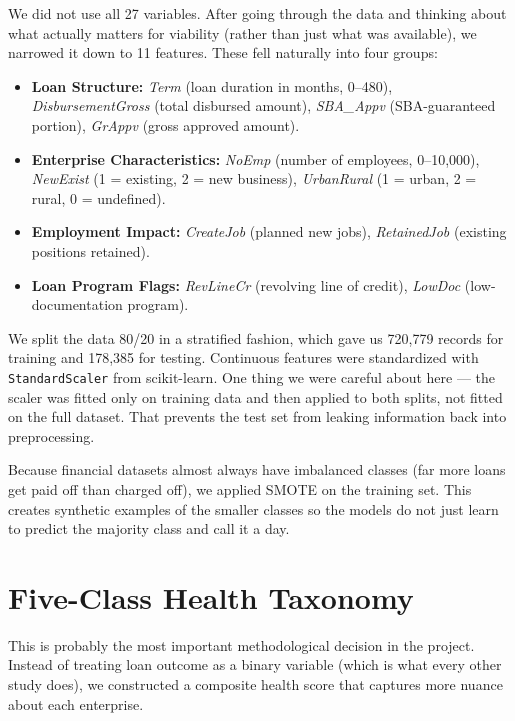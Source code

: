 \documentclass[12pt,a4paper]{report}
\begin{document}
We did not use all 27 variables. After going through the data and thinking about what actually matters for viability (rather than just what was available), we narrowed it down to 11 features. These fell naturally into four groups:

\begin{itemize}
    \item \textbf{Loan Structure:} \textit{Term} (loan duration in months, 0--480), \textit{DisbursementGross} (total disbursed amount), \textit{SBA\_Appv} (SBA-guaranteed portion), \textit{GrAppv} (gross approved amount).
    \item \textbf{Enterprise Characteristics:} \textit{NoEmp} (number of employees, 0--10,000), \textit{NewExist} (1 = existing, 2 = new business), \textit{UrbanRural} (1 = urban, 2 = rural, 0 = undefined).
    \item \textbf{Employment Impact:} \textit{CreateJob} (planned new jobs), \textit{RetainedJob} (existing positions retained).
    \item \textbf{Loan Program Flags:} \textit{RevLineCr} (revolving line of credit), \textit{LowDoc} (low-documentation program).
\end{itemize}

We split the data 80/20 in a stratified fashion, which gave us 720,779 records for training and 178,385 for testing. Continuous features were standardized with \texttt{StandardScaler} from scikit-learn. One thing we were careful about here --- the scaler was fitted only on training data and then applied to both splits, not fitted on the full dataset. That prevents the test set from leaking information back into preprocessing.

Because financial datasets almost always have imbalanced classes (far more loans get paid off than charged off), we applied SMOTE on the training set. This creates synthetic examples of the smaller classes so the models do not just learn to predict the majority class and call it a day.

\section{Five-Class Health Taxonomy}

This is probably the most important methodological decision in the project. Instead of treating loan outcome as a binary variable (which is what every other study does), we constructed a composite health score that captures more nuance about each enterprise.
\end{document}
